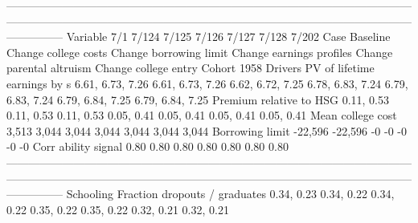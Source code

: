 ---------------------------------------------------------------------------------------------------------------------------------------------------------------------------------------------------------------------------------------
                              Variable                          7/1                        7/124                    7/125                     7/126                       7/127                       7/128                       7/202
                                  Case                     Baseline         Change college costs   Change borrowing limit  Change earnings profiles    Change parental altruism        Change college entry                 Cohort 1958
                               Drivers                                                                                                                                                                                                 
          PV of lifetime earnings by s             6.61, 6.73, 7.26             6.61, 6.73, 7.26         6.62, 6.72, 7.25          6.78, 6.83, 7.24            6.79, 6.83, 7.24            6.79, 6.84, 7.25            6.79, 6.84, 7.25
               Premium relative to HSG                   0.11, 0.53                   0.11, 0.53               0.11, 0.53                0.05, 0.41                  0.05, 0.41                  0.05, 0.41                  0.05, 0.41
                     Mean college cost                        3,513                        3,044                    3,044                     3,044                       3,044                       3,044                       3,044
                       Borrowing limit                      -22,596                      -22,596                       -0                        -0                          -0                          -0                          -0
                   Corr ability signal                         0.80                         0.80                     0.80                      0.80                        0.80                        0.80                        0.80
---------------------------------------------------------------------------------------------------------------------------------------------------------------------------------------------------------------------------------------
                             Schooling                                                                                                                                                                                                 
         Fraction dropouts / graduates                   0.34, 0.23                   0.34, 0.22               0.34, 0.22                0.35, 0.22                  0.35, 0.22                  0.32, 0.21                  0.32, 0.21
